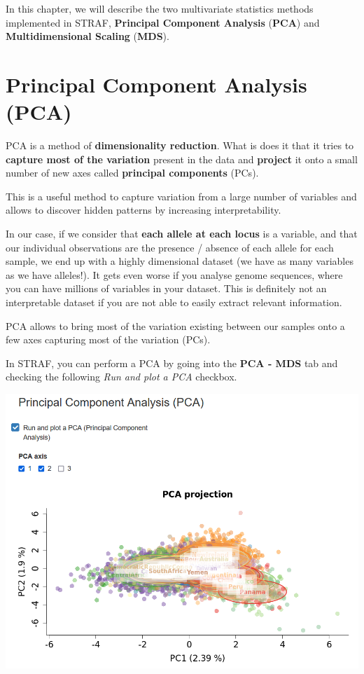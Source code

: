 \documentclass[
]{book}
\begin{document}
In this chapter, we will describe the two multivariate statistics methods implemented
in STRAF, \textbf{Principal Component Analysis} (\textbf{PCA}) and \textbf{Multidimensional Scaling} (\textbf{MDS}).

\hypertarget{principal-component-analysis-pca}{%
\section{Principal Component Analysis (PCA)}\label{principal-component-analysis-pca}}

PCA is a method of \textbf{dimensionality reduction}. What is does it that it tries to
\textbf{capture most of the variation} present in the data and \textbf{project} it onto a
small number of new axes called \textbf{principal components} (PCs).

This is a useful method to capture variation from a large number of variables and
allows to discover hidden patterns by increasing interpretability.

In our case, if we consider that \textbf{each allele at each locus} is a variable, and that
our individual observations are the presence / absence of each allele for each sample,
we end up with a highly dimensional dataset (we have as many variables as we have
alleles!). It gets even worse if you analyse genome sequences, where you can have millions
of variables in your dataset. This is definitely not an interpretable dataset if you
are not able to easily extract relevant information.

PCA allows to bring most of the variation existing between our samples onto a few
axes capturing most of the variation (PCs).

In STRAF, you can perform a PCA by going into the \textbf{PCA - MDS} tab and checking
the following \emph{Run and plot a PCA} checkbox.

\includegraphics[width=0.8\linewidth]{img/capture_pca_1}
\end{document}
